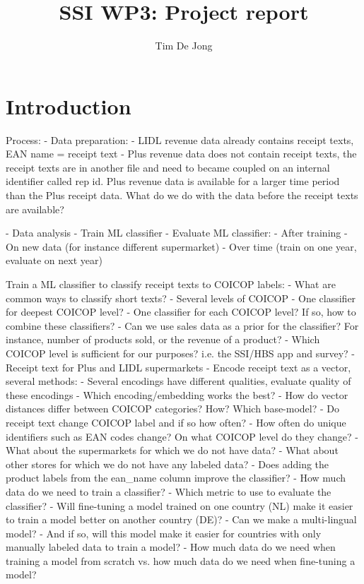 \documentclass{article}
\title{SSI WP3: Project report}
\author{Tim De Jong}
\begin{document}
\maketitle


\section{Introduction}

Process:
- Data preparation:
    - LIDL revenue data already contains receipt texts, EAN name = receipt text
    - Plus revenue data does not contain receipt texts, the receipt texts are in another file and need to became
    coupled on an internal identifier called rep id. Plus revenue data is available for a larger time period than the
    Plus receipt data. What do we do with the data before the receipt texts are available?

- Data analysis
- Train ML classifier
- Evaluate ML classifier:
    - After training
    - On new data (for instance different supermarket)
    - Over time (train on one year, evaluate on next year)




Train a ML classifier to classify receipt texts to COICOP labels:
- What are common ways to classify short texts?
- Several levels of COICOP
    - One classifier for deepest COICOP level?
    - One classifier for each COICOP level? If so, how to combine these classifiers?
    - Can we use sales data as a prior for the classifier? For instance, number of products sold, 
    or the revenue of a product?
    - Which COICOP level is sufficient for our purposes? i.e. the SSI/HBS app and survey?
- Receipt text for Plus and LIDL supermarkets
- Encode receipt text as a vector, several methods: 
    - Several encodings have different qualities, evaluate quality of these encodings
    - Which encoding/embedding works the best?
    - How do vector distances differ between COICOP categories? How? Which base-model?
- Do receipt text change COICOP label and if so how often?
- How often do unique identifiers such as EAN codes change? On what COICOP level do they change?
- What about the supermarkets for which we do not have data? 
- What about other stores for which we do not have any labeled data?
- Does adding the product labels from the ean\_name column improve the classifier?
- How much data do we need to train a classifier?
- Which metric to use to evaluate the classifier?
- Will fine-tuning a model trained on one country (NL) make it easier to train a model better on another country (DE)?
- Can we make a multi-lingual model?
    - And if so, will this model make it easier for countries with only manually labeled data to train a model?
    - How much data do we need when training a model from scratch vs. how much data do we need when fine-tuning a model?
\end{document}
